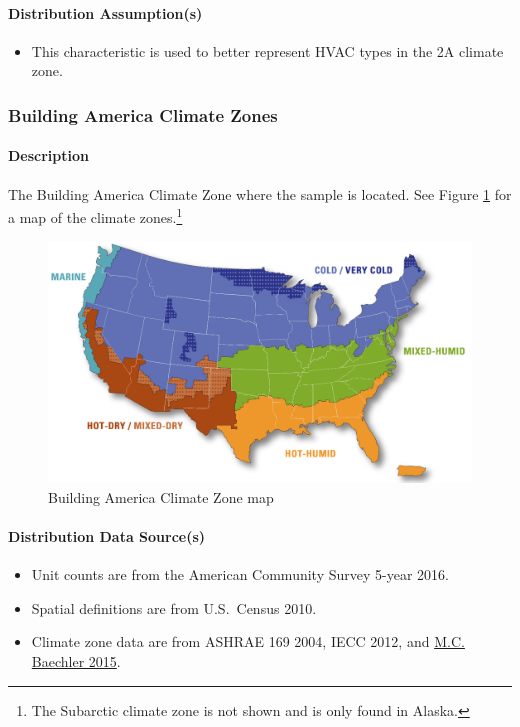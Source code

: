 \paragraph{Distribution Assumption(s)}
\begin{itemize}
    \item This characteristic is used to better represent HVAC types in the 2A climate zone.
\end{itemize}

\subsubsection{Building America Climate Zones}
\paragraph{Description}
The Building America Climate Zone where the sample is located. See Figure \ref{fig:building_america_cz} for a map of the climate zones.\footnote{The Subarctic climate zone is not shown and is only found in Alaska.}

\begin{figure}
    \centering
    \includegraphics[width=1\linewidth]{images/building_america_cz.png}
    \caption{Building America Climate Zone map}
    \label{fig:building_america_cz}
\end{figure}

\paragraph{Distribution Data Source(s)}
\begin{itemize}
    \item Unit counts are from the American Community Survey 5-year 2016.
    \item Spatial definitions are from U.S.~Census 2010.
    \item Climate zone data are from ASHRAE 169 2004, IECC 2012, and \href{https://www.energy.gov/sites/prod/files/2015/10/f27/ba_climate_region_guide_7.3.pdf}{M.C. Baechler 2015}.
\end{itemize}


